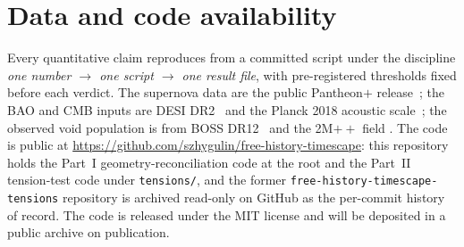 \documentclass[aps,prd,twocolumn,nofootinbib,superscriptaddress,floatfix]{revtex4-2}
\begin{document}
\section*{Data and code availability}
\label{sec:avail}
Every quantitative claim reproduces from a committed script under the discipline
\emph{one number $\to$ one script $\to$ one result file}, with pre-registered
thresholds fixed before each verdict. The supernova data are the public
Pantheon$+$ release~\cite{Scolnic2022,Brout2022}; the BAO and CMB inputs are
DESI DR2~\cite{DESIDR2} and the Planck 2018 acoustic scale~\cite{Planck2018}; the
observed void population is from BOSS DR12~\cite{Mao2017} and the 2M$++$ field
\cite{Carrick2015}. The code is public at
\url{https://github.com/szhygulin/free-history-timescape}: this repository holds the
Part~I geometry-reconciliation code at the root and the Part~II tension-test code
under \texttt{tensions/}, and the former \texttt{free-history-timescape-tensions}
repository is archived read-only on GitHub as the per-commit history of record.
The code is released under the MIT license and will be deposited in a public
archive on publication.
\end{document}
